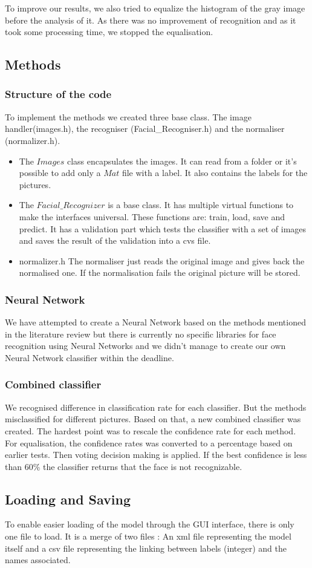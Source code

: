 To improve our results, we also tried to equalize the histogram of the gray image before the analysis of it. As there was no improvement of recognition and as it took some processing time, we stopped the equalisation.

\subsection{Methods}
\subsubsection{Structure of the code}

To implement the methods we created three base class. The image handler(images.h), the recogniser (Facial\_Recogniser.h) and the normaliser (normalizer.h).
\begin{itemize}
	\item The $Images$ class encapsulates the images. It can read from a folder or it's possible to add only a $Mat$ file with a label. It also contains the labels for the pictures.
	
	\item The $Facial\_Recognizer$ is a base class. It has multiple virtual functions to make the interfaces universal. These functions are: train, load, save and predict. It has a validation part which tests the classifier with a set of images and saves the result of the validation into a cvs file.
	
	\item normalizer.h
	The normaliser just reads the original image and gives back the normalised one. If the normalisation fails the original picture will be stored.
	
\end{itemize}

\subsubsection{Neural Network}
We have attempted to create a Neural Network based on the methods mentioned in the literature review but there is currently no specific libraries for face recognition using Neural 
Networks and we didn't manage to create our own Neural Network classifier within the deadline.

\subsubsection{Combined classifier}
We recognised difference in classification rate for each classifier. But the methods misclassified for different pictures. Based on that, a new combined classifier was created. The hardest point was to rescale the confidence rate for each method. For equalisation, the confidence rates was converted to a percentage based on earlier tests. Then voting decision making is applied. If the best confidence is less than 60\% the classifier returns that the face is not recognizable.

\subsection{Loading and Saving}
To enable easier loading of the model through the GUI interface, there is only one file to load. It is a merge of two files : An xml file representing the model itself and a csv file representing the linking between labels (integer) and the names associated.
